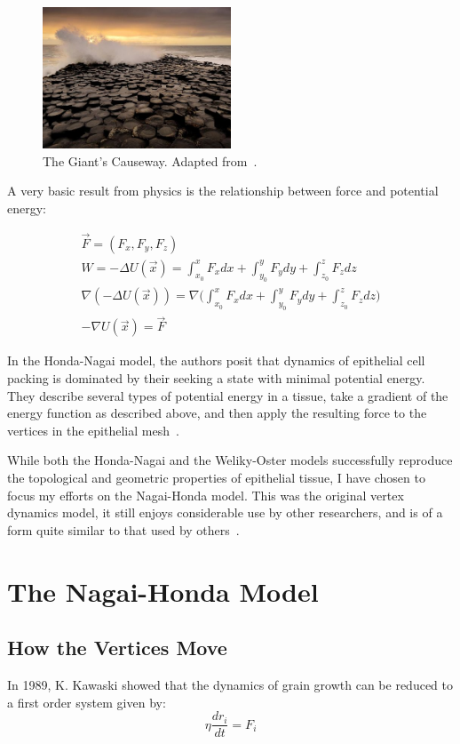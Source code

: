 \begin{figure}[h]
\centering
\includegraphics[width=0.5\textwidth]{../diagrams/resize_giant.jpg}
\caption{The Giant's Causeway. Adapted from~\cite{Giant}.}
\label{fig:cause}
\end{figure}

A very basic result from physics is the relationship between force and potential energy:

\begin{gather}
\vec{F} = (F_x, F_y, F_z)\\
W = -\Delta U(\vec{x}) = \int_{x_0}^xF_xdx+\int_{y_0}^yF_ydy+\int_{z_0}^zF_zdz\\
\nabla(-\Delta U(\vec{x})) = \nabla\Bigg(\int_{x_0}^xF_xdx+\int_{y_0}^yF_ydy+\int_{z_0}^zF_zdz\Bigg)\\
-\nabla U(\vec{x}) = \vec{F}
\end{gather}

In the Honda-Nagai model, the authors posit that dynamics of epithelial cell packing is dominated by their seeking a state with minimal potential energy. They describe several types of potential energy in a tissue, take a gradient of the energy function as described above, and then apply the resulting force to the vertices in the epithelial mesh~\cite{HondaNagai}.

While both the Honda-Nagai and the Weliky-Oster models successfully reproduce the topological and geometric properties of epithelial tissue, I have chosen to focus my efforts on the Nagai-Honda model. This was the original vertex dynamics model, it still enjoys considerable use by other researchers, and is of a form quite similar to that used by others~\cite{Farhadifar}.

\section{The Nagai-Honda Model}
\label{sec:force}
\subsection{How the Vertices Move}
In 1989, K. Kawaski showed that the dynamics of grain growth can be reduced to a first order system given by:
\begin{equation}
\label{eq:motion}
\eta\frac{dr_i}{dt} = F_i
\end{equation}

